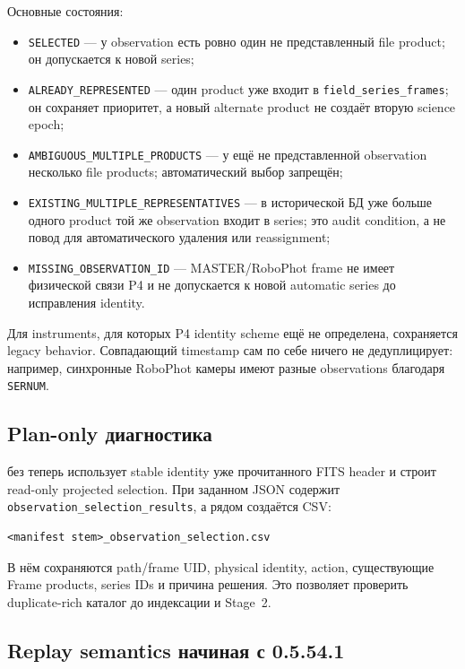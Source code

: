 Основные состояния:

\begin{itemize}
  \item \texttt{SELECTED} --- у observation есть ровно один не представленный file product; он допускается к новой series;
  \item \texttt{ALREADY\_REPRESENTED} --- один product уже входит в \texttt{field\_series\_frames}; он сохраняет приоритет, а новый alternate product не создаёт вторую science epoch;
  \item \texttt{AMBIGUOUS\_MULTIPLE\_PRODUCTS} --- у ещё не представленной observation несколько file products; автоматический выбор запрещён;
  \item \texttt{EXISTING\_MULTIPLE\_REPRESENTATIVES} --- в исторической БД уже больше одного product той же observation входит в series; это audit condition, а не повод для автоматического удаления или reassignment;
  \item \texttt{MISSING\_OBSERVATION\_ID} --- MASTER/RoboPhot frame не имеет физической связи P4 и не допускается к новой automatic series до исправления identity.
\end{itemize}

Для instruments, для которых P4 identity scheme ещё не определена, сохраняется legacy behavior. Совпадающий timestamp сам по себе ничего не дедуплицирует: например, синхронные RoboPhot камеры имеют разные observations благодаря \texttt{SERNUM}.

\subsection{Plan-only диагностика}

 без  теперь использует stable identity уже прочитанного FITS header и строит read-only projected selection. При заданном  JSON содержит \texttt{observation\_selection\_results}, а рядом создаётся CSV:

\begin{verbatim}
<manifest stem>_observation_selection.csv
\end{verbatim}

В нём сохраняются path/frame UID, physical identity, action, существующие Frame products, series IDs и причина решения. Это позволяет проверить duplicate-rich каталог до индексации и Stage~2.

\subsection{Replay semantics начиная с 0.5.54.1}


